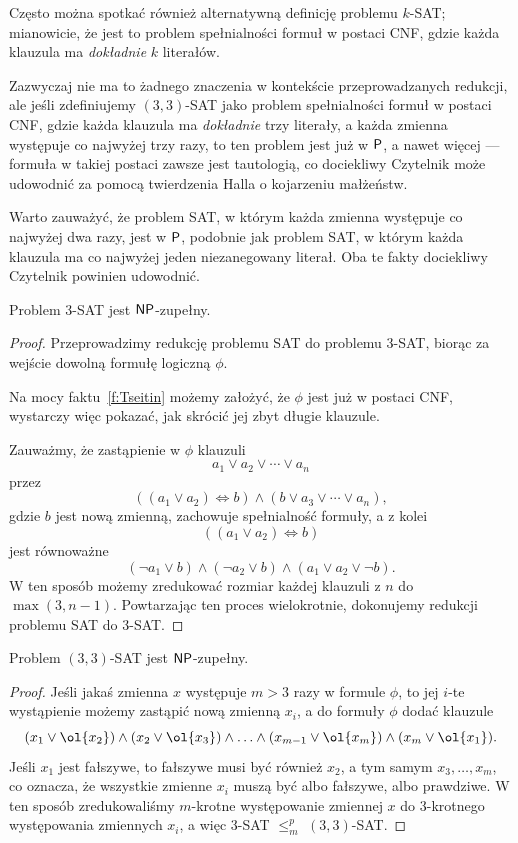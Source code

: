 \begin{remark}
    Często można spotkać również alternatywną definicję problemu $k$-SAT; mianowicie, że jest to problem spełnialności formuł w postaci CNF, gdzie każda klauzula ma \emph{dokładnie} $k$ literałów.

    Zazwyczaj nie ma to żadnego znaczenia w kontekście przeprowadzanych redukcji, ale jeśli zdefiniujemy $(3, 3)$-SAT jako problem spełnialności formuł w postaci CNF, gdzie każda klauzula ma \emph{dokładnie} trzy literały, a każda zmienna występuje co najwyżej trzy razy, to ten problem jest już w $\textsf{P}$, a nawet więcej --- formuła w takiej postaci zawsze jest tautologią, co dociekliwy Czytelnik może udowodnić za pomocą twierdzenia Halla o kojarzeniu małżeństw.
\end{remark}

Warto zauważyć, że problem SAT, w którym każda zmienna występuje co najwyżej dwa razy, jest w $\textsf{P}$, podobnie jak problem SAT, w którym każda klauzula ma co najwyżej jeden niezanegowany literał. Oba te fakty dociekliwy Czytelnik powinien udowodnić.

\begin{theorem}\label{t:3-SAT}
    Problem 3-SAT jest $\textsf{NP}$-zupełny.
\end{theorem}
\begin{proof}
    Przeprowadzimy redukcję problemu SAT do problemu 3-SAT, biorąc za wejście dowolną formułę logiczną $\phi$.

    Na mocy faktu~\ref{f:Tseitin} możemy założyć, że $\phi$ jest już w postaci CNF, wystarczy więc pokazać, jak skrócić jej zbyt długie klauzule.

    Zauważmy, że zastąpienie w $\phi$ klauzuli
    \[ a_1 \lor a_2 \lor \cdots \lor a_n \]
    przez
    \[ ((a_1 \lor a_2) \Leftrightarrow b) \land (b \lor a_3 \lor \cdots \lor a_n), \]
    gdzie $b$ jest nową zmienną, zachowuje spełnialność formuły, a z kolei
    \[ ((a_1 \lor a_2) \Leftrightarrow b) \]
    jest równoważne
    \[ (\neg a_1 \lor b) \land (\neg a_2 \lor b) \land (a_1 \lor a_2 \lor \neg b). \]
    W ten sposób możemy zredukować rozmiar każdej klauzuli z $n$ do $\max(3, n-1)$. Powtarzając ten proces wielokrotnie, dokonujemy redukcji problemu SAT do 3-SAT.
\end{proof}

\begin{theorem}\label{t:3-3-SAT}
    Problem $(3, 3)$-SAT jest $\textsf{NP}$-zupełny.
\end{theorem}
\begin{proof}
    Jeśli jakaś zmienna $x$ występuje $m > 3$ razy w formule $\phi$, to jej $i$-te wystąpienie możemy zastąpić nową zmienną $x_i$, a do formuły $\phi$ dodać klauzule
    \[ (x_1 \lor \ol{x_2}) \land (x_2 \lor \ol{x_3}) \land \ldots \land (x_{m-1} \lor \ol{x_m}) \land (x_m \lor \ol{x_1}). \]
    Jeśli $x_1$ jest fałszywe, to fałszywe musi być również $x_2$, a tym samym $x_3, \ldots, x_m$, co oznacza, że wszystkie zmienne $x_i$ muszą być albo fałszywe, albo prawdziwe. W ten sposób zredukowaliśmy $m$-krotne występowanie zmiennej $x$ do 3-krotnego występowania zmiennych $x_i$, a więc 3-SAT $\leq_m^p$ $(3, 3)$-SAT.
\end{proof}

